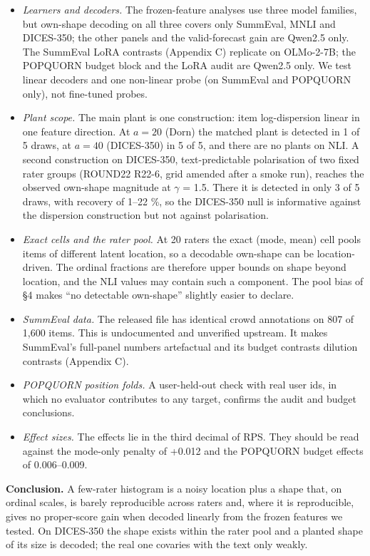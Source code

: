 \documentclass[10pt,twocolumn]{article}
\providecommand{\tightlist}{\setlength{\itemsep}{0pt}\setlength{\parskip}{0pt}}
\begin{document}
\begin{itemize}
\tightlist
\item
  \emph{Learners and decoders.} The frozen-feature analyses use three model families, but own-shape decoding on all three covers only SummEval, MNLI and DICES-350; the other panels and the valid-forecast gain are Qwen2.5 only. The SummEval LoRA contrasts (Appendix C) replicate on OLMo-2-7B; the POPQUORN budget block and the LoRA audit are Qwen2.5 only. We test linear decoders and one non-linear probe (on SummEval and POPQUORN only), not fine-tuned probes.
\item
  \emph{Plant scope.} The main plant is one construction: item log-dispersion linear in one feature direction. At \(a=20\) (Dorn) the matched plant is detected in 1 of 5 draws, at \(a=40\) (DICES-350) in 5 of 5, and there are no plants on NLI. A second construction on DICES-350, text-predictable polarisation of two fixed rater groups (ROUND22 R22-6, grid amended after a smoke run), reaches the observed own-shape magnitude at $\gamma$ = 1.5. There it is detected in only 3 of 5 draws, with recovery of 1--22 \%, so the DICES-350 null is informative against the dispersion construction but not against polarisation.
\item
  \emph{Exact cells and the rater pool.} At 20 raters the exact (mode, mean) cell pools items of different latent location, so a decodable own-shape can be location-driven. The ordinal fractions are therefore upper bounds on shape beyond location, and the NLI values may contain such a component. The pool bias of \S{}4 makes ``no detectable own-shape'' slightly easier to declare.
\item
  \emph{SummEval data.} The released file has identical crowd annotations on 807 of 1,600 items. This is undocumented and unverified upstream. It makes SummEval's full-panel numbers artefactual and its budget contrasts dilution contrasts (Appendix C).
\item
  \emph{POPQUORN position folds.} A user-held-out check with real user ids, in which no evaluator contributes to any target, confirms the audit and budget conclusions.
\item
  \emph{Effect sizes.} The effects lie in the third decimal of RPS. They should be read against the mode-only penalty of +0.012 and the POPQUORN budget effects of 0.006--0.009.
\end{itemize}

\textbf{Conclusion.} A few-rater histogram is a noisy location plus a shape that, on ordinal scales, is barely reproducible across raters and, where it is reproducible, gives no proper-score gain when decoded linearly from the frozen features we tested. On DICES-350 the shape exists within the rater pool and a planted shape of its size is decoded; the real one covaries with the text only weakly.
\end{document}
